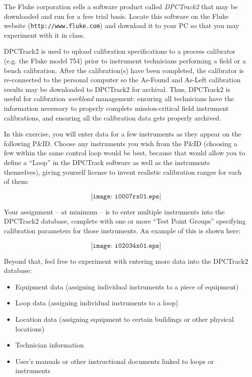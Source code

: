 

The Fluke corporation sells a software product called {\it DPCTrack2} that may be downloaded and run for a free trial basis.  Locate this software on the Fluke website ({\tt http://www.fluke.com}) and download it to your PC so that you may experiment with it in class.

DPCTrack2 is used to upload calibration specifications to a process calibrator (e.g. the Fluke model 754) prior to instrument technicians performing a field or a bench calibration.  After the calibration(s) have been completed, the calibrator is re-connected to the personal computer so the As-Found and As-Left calibration results may be downloaded to DPCTrack2 for archival.  Thus, DPCTrack2 is useful for calibration {\it workload} management: ensuring all technicians have the information necessary to properly complete mission-critical field instrument calibrations, and ensuring all the calibration data gets properly archived.

\vskip 10pt

In this exercise, you will enter data for a few instruments as they appear on the following P\&ID.  Choose any instruments you wish from the P\&ID (choosing a few within the same control loop would be best, because that would allow you to define a ``Loop'' in the DPCTrack software as well as the instruments themselves), giving yourself license to invent realistic calibration ranges for each of them:

$$\texttt{[image: i0007rx01.eps]}$$

\vskip 10pt

\filbreak

Your assignment -- at minimum -- is to enter multiple instruments into the DPCTrack2 database, complete with one or more ``Test Point Groups'' specifying calibration parameters for those instruments.  An example of this is shown here:

$$\texttt{[image: i02034x01.eps]}$$

Beyond that, feel free to experiment with entering more data into the DPCTrack2 database:

\begin{itemize}
\item{} Equipment data (assigning individual instruments to a piece of equipment)
\item{} Loop data (assigning individual instruments to a loop)
\item{} Location data (assigning equipment to certain buildings or other physical locations)
\item{} Technician information
\item{} User's manuals or other instructional documents linked to loops or instruments
\end{itemize}

